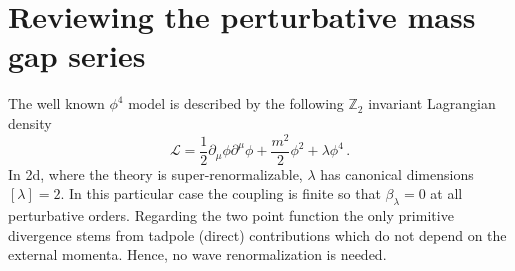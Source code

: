 \documentclass[a4paper,11pt]{article}
\def\be{\begin{equation}}
\def\ee{\end{equation}}
\begin{document}
\section{Reviewing the   perturbative mass gap series}

The well known $\phi^4$ model is described by the  following $\mathbb{Z}_2$ invariant Lagrangian density 
\be\label{eq:Lagrangian}
\mathcal{L} = \frac{1}{2}\partial_{\mu}\phi\partial^{\mu}\phi + \frac{m^2}{2}\phi^2 + \lambda\phi^4 \,.
\ee
In 2d, where the theory is super-renormalizable, $\lambda$   has canonical dimensions $[\lambda] = 2$. In this particular case the coupling  is finite so that $\beta_\lambda =0$ at all perturbative orders. Regarding the two point function the only  primitive divergence stems from tadpole (direct) contributions which do not depend on the external momenta. Hence, no wave renormalization is needed. 
\end{document}
